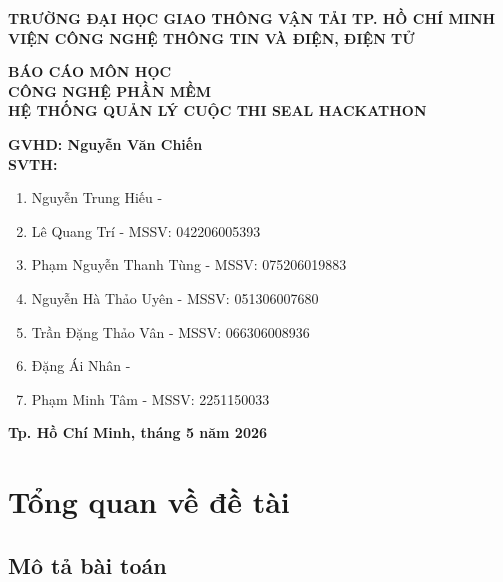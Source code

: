 ﻿\begin{titlepage}
    \centering

    \textbf{TRƯỜNG ĐẠI HỌC GIAO THÔNG VẬN TẢI TP. HỒ CHÍ MINH}\\
    \textbf{VIỆN CÔNG NGHỆ THÔNG TIN VÀ ĐIỆN, ĐIỆN TỬ}\\

    \vspace{2cm}

    \textbf{BÁO CÁO MÔN HỌC}\\
    \vspace{0.5cm}
    \textbf{CÔNG NGHỆ PHẦN MỀM}\\
    \vspace{0.5cm}
    \textbf{\color{red}HỆ THỐNG QUẢN LÝ CUỘC THI SEAL HACKATHON}\\
    \vspace{1cm}

    \textbf{GVHD: Nguyễn Văn Chiến}\\
    \vspace{0.5cm}
    \textbf{SVTH:}\\
    \vspace{0.5cm}

    \begin{enumerate}
        \item Nguyễn Trung Hiếu -
        \item Lê Quang Trí - MSSV: 042206005393
        \item Phạm Nguyễn Thanh Tùng - MSSV: 075206019883
        \item Nguyễn Hà Thảo Uyên - MSSV: 051306007680
        \item Trần Đặng Thảo Vân - MSSV: 066306008936
        \item Đặng Ái Nhân -
        \item Phạm Minh Tâm - MSSV: 2251150033
    \end{enumerate}

    \vfill
    \textbf{Tp. Hồ Chí Minh, tháng 5 năm 2026}

\end{titlepage}

\tableofcontents
\newpage

\chapter{Tổng quan về đề tài}

\section{Mô tả bài toán}

